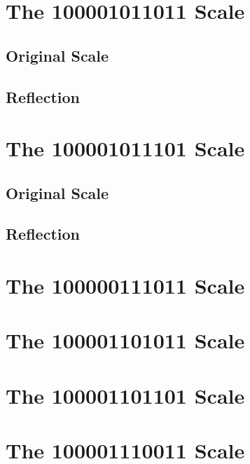 \documentclass[english]{./gbook}
\begin{document}
\begin{large}
\section{The 100001011011 Scale}
\subsection*{Original Scale}
\subsection{Reflection}

\section{The 100001011101 Scale}
\subsection*{Original Scale}
\subsection{Reflection}

\section{The 100000111011 Scale}

\section{The 100001101011 Scale}

\section{The 100001101101 Scale}

\section{The 100001110011 Scale}














\end{large}
\end{document}
